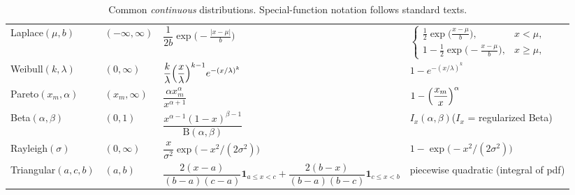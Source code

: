 \documentclass{article}
\begin{document}
\begin{table}[ht]
\begin{tabular}{@{}l l l l@{}}
Laplace$(\mu,b)$          & $(-\infty,\infty)$ &
$ \dfrac{1}{2b}\exp\!\bigl(-\tfrac{|x-\mu|}{b}\bigr)$ &
$ \begin{cases}
  \tfrac12\exp\!\bigl(\tfrac{x-\mu}{b}\bigr), & x<\mu,\\[3pt]
  1-\tfrac12\exp\!\bigl(-\tfrac{x-\mu}{b}\bigr), & x\ge\mu,
  \end{cases}$ \\[12pt]

Weibull$(k,\lambda)$      & $(0,\infty)$ &
$ \dfrac{k}{\lambda}\Bigl(\dfrac{x}{\lambda}\Bigr)^{k-1}
  e^{-(x/\lambda)^{k}}$ &
$ 1-e^{-(x/\lambda)^{k}}$ \\[9pt]

Pareto$(x_{m},\alpha)$    & $(x_{m},\infty)$ &
$ \dfrac{\alpha x_{m}^{\alpha}}{x^{\alpha+1}}$ &
$ 1-\Bigl(\dfrac{x_{m}}{x}\Bigr)^{\alpha}$ \\[9pt]

Beta$(\alpha,\beta)$      & $(0,1)$ &
$ \dfrac{x^{\alpha-1}(1-x)^{\beta-1}}{\mathrm B(\alpha,\beta)}$ &
$ I_{x}(\alpha,\beta)$\quad($I_{x}$ = regularized Beta) \\[9pt]

Rayleigh$(\sigma)$        & $(0,\infty)$ &
$ \dfrac{x}{\sigma^{2}} \exp\!\bigl(-x^{2}/(2\sigma^{2})\bigr)$ &
$ 1-\exp\!\bigl(-x^{2}/(2\sigma^{2})\bigr)$ \\[6pt]

Triangular$(a,c,b)$       & $(a,b)$ &
$ \dfrac{2(x-a)}{(b-a)(c-a)}\mathbf 1_{a\le x<c}
 +\dfrac{2(b-x)}{(b-a)(b-c)}\mathbf 1_{c\le x<b}$ &
piecewise quadratic (integral of pdf) \\[6pt]
\bottomrule
\end{tabular}
\caption{Common \emph{continuous} distributions.  Special-function notation follows standard texts.}
\end{table}
\end{document}
